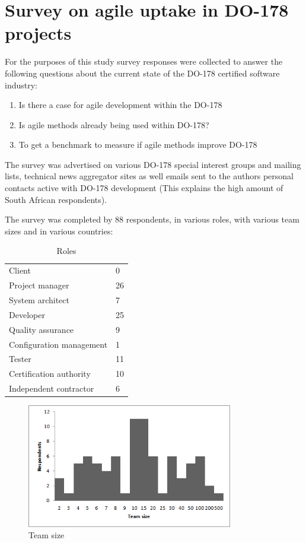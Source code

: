 \documentclass{sig-alternate-05-2015}
\begin{document}
\section{Survey on agile uptake in DO-178 projects}
For the purposes of this study survey responses were collected to answer the following questions about the current state of the DO-178 certified software industry:
\begin{enumerate}
	\item Is there a case for agile development within the DO-178 %
	\item Is agile methods already being used within DO-178?
	\item To get a benchmark to measure if agile methods improve DO-178 %
\end{enumerate} 

The survey was advertised on various DO-178 special interest groups and mailing lists, technical news aggregator sites as well emails sent to the authors personal contacts active with DO-178 development (This explains the high amount of South African respondents).

The survey was completed by 88 respondents, in various roles, with various team sizes and in various countries:
\begin{table}[]
	\centering
	\caption{Roles}
	\label{Roles}
	\begin{tabular}{l|l}
		Client          			& 0    \\
		Project manager 			& 26   \\
		System architect 			& 7    \\
		Developer 					& 25   \\
		Quality assurance 			& 9    \\
		Configuration management 	& 1    \\
		Tester 						& 11   \\
		Certification authority 	& 10   \\
		Independent contractor 		& 6  
	\end{tabular}
\end{table}

\begin{figure}[t!]
	\centering
	\includegraphics[width=90mm]{Teams.png}
	\caption{Team size}
\end{figure}
\end{document}
